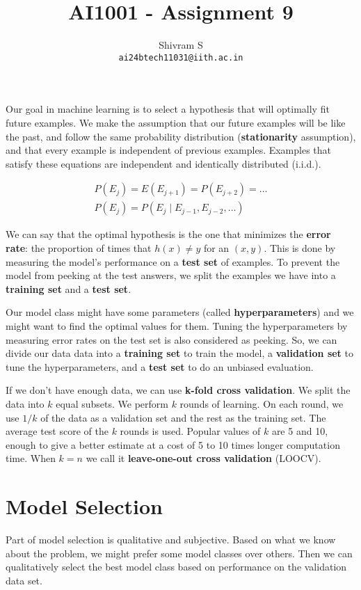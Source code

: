 \documentclass{article}
\author{Shivram S \\ \texttt{ai24btech11031@iith.ac.in}}
\title{AI1001 - Assignment 9}
\begin{document}
\maketitle

Our goal in machine learning is to select a hypothesis that will
optimally fit future examples. We make the assumption that our 
future examples will be like the past, and follow the same probability
distribution (\textbf{stationarity} assumption), and that every example
is independent of previous examples. Examples that satisfy these
equations are independent and identically distributed (i.i.d.).

\begin{eqnarray*}    
P(E_j) = E(E_{j+1}) = P(E_{j+2}) = \dots \\
P(E_j) = P(E_j \mid E_{j-1}, E_{j-2}, \dots)
\end{eqnarray*}

We can say that the optimal hypothesis is the one that minimizes the
\textbf{error rate}: the proportion of times that $h(x) \ne y$ for an
$(x,y)$. This is done by measuring the model's performance on a
\textbf{test set} of examples. To prevent the model from peeking at the
test answers, we split the examples we have into a \textbf{training set}
and a \textbf{test set}.

Our model class might have some parameters (called \textbf{hyperparameters})
and we might want to find the optimal values for them. Tuning the 
hyperparameters by measuring error rates on the test set is also considered as peeking.
So, we can divide our data data into a \textbf{training set} to train the
model, a \textbf{validation set} to tune the hyperparameters, and a
\textbf{test set} to do an unbiased evaluation.

If we don't have enough data, we can use \textbf{k-fold cross validation}.
We split the data into $k$ equal subsets. We perform $k$ rounds of
learning. On each round, we use $1/k$ of the data as a validation set
and the rest as the training set. The average test score of the
$k$ rounds is used. Popular values of $k$ are 5 and 10, enough to
give a better estimate at a cost of 5 to 10 times longer computation
time. When $k=n$ we call it \textbf{leave-one-out cross validation} (LOOCV).

\section{Model Selection}

Part of model selection is qualitative and subjective. Based on what
we know about the problem, we might prefer some model classes over others.
Then we can qualitatively select the best model class based on
performance on the validation data set.
\end{document}
